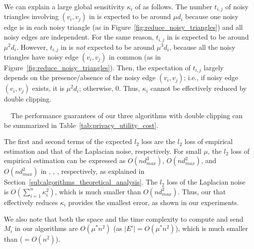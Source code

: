 We can explain a large global sensitivity $\kappa_i$ of \AlgThree{} as follows. 
The number $t_{i,j}$ of noisy triangles involving $(v_i,v_j)$ in 
\AlgOne{} is expected to be around $\mu d_i$ because one noisy edge is in each noisy triangle (as in Figure~\ref{fig:reduce_noisy_triangles}) and all noisy edges are independent. 
For the same reason, $t_{i,j}$ in \AlgTwo{} is expected to be around $\mu^2 d_i$.  
% 
However, 
$t_{i,j}$ in \AlgThree{} is \textit{not} expected to be around $\mu^3 d_i$, because all the noisy triangles have noisy edge $(v_i,v_j)$ in common (as in Figure~\ref{fig:reduce_noisy_triangles}). 
Then, 
the expectation of $t_{i,j}$ 
largely depends on the presence/absence of the noisy edge $(v_i,v_j)$; i.e., if noisy edge $(v_i,v_j)$ exists, 
it is $\mu^2 d_i$; otherwise, $0$. 
Thus, 
$\kappa_i$ 
cannot be effectively reduced by double clipping. 

\smallskip
{}~~The 
performance guarantees 
of our three algorithms with double clipping can be summarized in Table~\ref{tab:privacy_utility_cost}.

The first and second terms of the expected 
$l_2$ loss are the $l_2$ loss of empirical estimation and that of the Laplacian noise, respectively. 
For small 
$\mu$, 
the $l_2$ loss of empirical estimation can be expressed as $O(n d_{max}^3)$, $O(n d_{max}^2)$, and $O(n d_{max}^2)$ in \AlgOne{}, \AlgTwo{}, \AlgThree{}, respectively, as explained in Section~\ref{sub:algorithms_theoretical_analysis}. 
The $l_2$ loss of the Laplacian noise is 
$O(\sum_{i=1}^n \kappa_i^2)$, 
which is much smaller than $O(n d_{max}^2)$. 
Thus, our \AlgTwo{} that effectively reduces $\kappa_i$ provides the smallest error, 
as shown in our experiments.

We also note that 
both the space and the time complexity to compute and send $M_i$ in our algorithms 
are $O(\mu^* n^2)$ (as $|E'| =  O(\mu^* n^2)$), which is much smaller than \cite{Imola_USENIX21} ($=O(n^2)$). 


